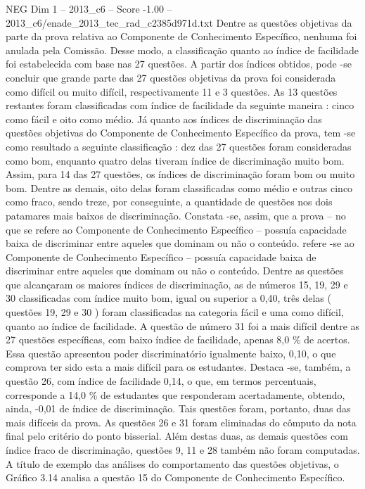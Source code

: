 \begin{textsample}{NEG Dim 1 – 2013\_c6 – Score -1.00 – 2013\_c6/enade\_2013\_tec\_rad\_c2385d971d.txt}
Dentre as questões objetivas da parte da prova relativa ao Componente de Conhecimento Específico, nenhuma foi anulada pela Comissão.
Desse modo, a classificação quanto ao índice de facilidade foi estabelecida com base nas 27 questões.
A partir dos índices obtidos, pode -se concluir que grande parte das 27 questões objetivas da prova foi considerada como difícil ou muito difícil, respectivamente 11 e 3 questões.
As 13 questões restantes foram classificadas com índice de facilidade da seguinte maneira : cinco como fácil e oito como médio.
Já quanto aos índices de discriminação das questões objetivas do Componente de Conhecimento Específico da prova, tem -se como resultado a seguinte classificação : dez das 27 questões foram consideradas como bom, enquanto quatro delas tiveram índice de discriminação muito bom.
Assim, para 14 das 27 questões, os índices de discriminação foram bom ou muito bom.
Dentre as demais, oito delas foram classificadas como médio e outras cinco como fraco, sendo treze, por conseguinte, a quantidade de questões nos dois patamares mais baixos de discriminação.
Constata -se, assim, que a prova – no que se refere ao Componente de Conhecimento Específico – possuía capacidade baixa de discriminar entre aqueles que dominam ou não o conteúdo. refere -se ao Componente de Conhecimento Específico – possuía capacidade baixa de discriminar entre aqueles que dominam ou não o conteúdo.
Dentre as questões que alcançaram os maiores índices de discriminação, as de números 15, 19, 29 e 30 classificadas com índice muito bom, igual ou superior a 0,40, três delas ( questões 19, 29 e 30 ) foram classificadas na categoria fácil e uma como difícil, quanto ao índice de facilidade.
A questão de número 31 foi a mais difícil dentre as 27 questões específicas, com baixo índice de facilidade, apenas 8,0 \% de acertos.
Essa questão apresentou poder discriminatório igualmente baixo, 0,10, o que comprova ter sido esta a mais difícil para os estudantes.
Destaca -se, também, a questão 26, com índice de facilidade 0,14, o que, em termos percentuais, corresponde a 14,0 \% de estudantes que responderam acertadamente, obtendo, ainda, -0,01 de índice de discriminação.
Tais questões foram, portanto, duas das mais difíceis da prova.
As questões 26 e 31 foram eliminadas do cômputo da nota final pelo critério do ponto bisserial.
Além destas duas, as demais questões com índice fraco de discriminação, questões 9, 11 e 28 também não foram computadas.
A título de exemplo das análises do comportamento das questões objetivas, o Gráfico 3.14 analisa a questão 15 do Componente de Conhecimento Específico.

\end{textsample}
